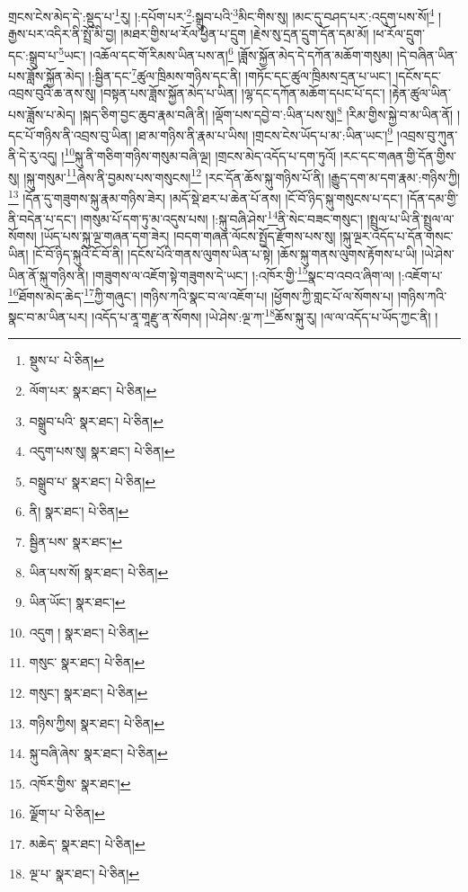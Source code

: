 གྲངས་ངེས་མེད་དེ་:སྡུད་པ་\footnote{སྡུས་པ་  པེ་ཅིན། }རུ། །:དཔོག་པར་\footnote{ལོག་པར་  སྣར་ཐང་།  པེ་ཅིན། }:སྒྲུབ་པའི་\footnote{བསྒྲུབ་པའི་  སྣར་ཐང་།  པེ་ཅིན། }མིང་གིས་སུ། །མང་དུ་བཤད་པར་:འདུག་པས་སོ།\footnote{འདུག་པས་སུ།  སྣར་ཐང་།  པེ་ཅིན། } །རྒྱས་པར་འདིར་ནི་སྤྲོ་མི་བྱ། །མཐར་གྱིས་ཕ་རོལ་ཕྱིན་པ་དྲུག །རྗེས་སུ་དྲན་དྲུག་དོན་དམ་མོ། །ཕ་རོལ་དྲུག་དང་:སྒྲུབ་པ་\footnote{བསྒྲུབ་པ་  སྣར་ཐང་།  པེ་ཅིན། }ཡང་། །འཆོལ་དང་གོ་རིམས་ཡིན་པས་ན།\footnote{ནི།  སྣར་ཐང་།  པེ་ཅིན། } །ཟློས་སྐྱོན་མེད་དེ་དཀོན་མཆོག་གསུམ། །དེ་བཞིན་ཡིན་པས་ཟློས་སྐྱོན་མེད། །:སྦྱིན་དང་\footnote{སྦྱིན་པས་  སྣར་ཐང་། }ཚུལ་ཁྲིམས་གཉིས་དང་ནི། །གཏོང་དང་ཚུལ་ཁྲིམས་དྲན་པ་ཡང་། །དངོས་དང་འབྲས་བུའི་ཆ་ནས་སུ། །བསྟན་པས་ཟློས་སྐྱོན་མེད་པ་ཡིན། །ལྷ་དང་དཀོན་མཆོག་དཔང་པོ་དང་། །རྟེན་ཚུལ་ཡིན་པས་ཟློས་པ་མེད། །སྐད་ཅིག་བྱང་ཆུབ་རྣམ་བཞི་ནི། །ལྡོག་པས་དབྱེ་བ་:ཡིན་པས་སུ།\footnote{ཡིན་པས་སོ།  སྣར་ཐང་།  པེ་ཅིན། } །རིམ་གྱིས་སྐྱེ་བ་མ་ཡིན་ནོ། །དང་པོ་གཉིས་ནི་འབྲས་བུ་ཡིན། །ཐ་མ་གཉིས་ནི་རྣམ་པ་ཡིས། །གྲངས་ངེས་ཡོད་པ་མ་:ཡིན་ཡང་།\footnote{ཡིན་ཡོང་།  སྣར་ཐང་། } །འབྲས་བུ་ཀུན་ནི་དེ་རུ་འདུ། །\footnote{འདུག །  སྣར་ཐང་།  པེ་ཅིན། }སྐུ་ནི་གཅིག་གཉིས་གསུམ་བཞི་ལྔ། །གྲངས་མེད་འདོད་པ་དག་ཏུའོ། །རང་དང་གཞན་གྱི་དོན་གྱིས་སུ། །སྐུ་གསུམ་\footnote{གསུང་  སྣར་ཐང་།  པེ་ཅིན། }ཞེས་ནི་བྱམས་པས་གསུངས།\footnote{གསུང་།  སྣར་ཐང་།  པེ་ཅིན། } །རང་དོན་ཆོས་སྐུ་གཉིས་པོ་ནི། །རྒྱུད་དག་མ་དག་རྣམ་:གཉིས་ཀྱི།\footnote{གཉིས་ཀྱིས།  སྣར་ཐང་།  པེ་ཅིན། } །དོན་དུ་གཟུགས་སྐུ་རྣམ་གཉིས་ཟེར། །མདོ་སྡེ་ཐར་པ་ཆེན་པོ་ནས། །ངོ་བོ་ཉིད་སྐུ་གསུངས་པ་དང་། །དོན་དམ་གྱི་ནི་བདེན་པ་དང་། །གསུམ་པོ་དག་ཏུ་མ་འདུས་པས། །:སྐུ་བཞི་ཤེས་\footnote{སྐུ་བཞི་ཞེས་  སྣར་ཐང་།  པེ་ཅིན། }ནི་སེང་བཟང་གསུང་། །སྤྲུལ་པ་ཡི་ནི་སྤྲུལ་ལ་སོགས། །ཡོད་པས་སྐུ་ལྔ་གཞན་དག་ཟེར། །བདག་གཞན་ལོངས་སྤྱོད་རྫོགས་པས་སུ། །སྐུ་ལྔར་འདོད་པ་དོན་གསང་ཡིན། །ངོ་བོ་ཉིད་སྐུའི་ངོ་བོ་ནི། །དངོས་པོའི་གནས་ལུགས་ཡིན་པ་སྟེ། །ཆོས་སྐུ་གནས་ལུགས་རྟོགས་པ་ཡི། །ཡེ་ཤེས་ཡིན་ནོ་སྐུ་གཉིས་ནི། །གཟུགས་ལ་འཇོག་སྟེ་གཟུགས་དེ་ཡང་། །:འཁོར་གྱི་\footnote{འཁོར་གྱིས་  སྣར་ཐང་། }སྣང་བ་འབའ་ཞིག་ལ། །:འཇོག་པ་\footnote{ལྗོག་པ་  པེ་ཅིན། }ཐོགས་མེད་ཆེད་\footnote{མཆེད་  སྣར་ཐང་།  པེ་ཅིན། }ཀྱི་གཞུང་། །གཉིས་ཀའི་སྣང་བ་ལ་འཇོག་པ། །ཕྱོགས་ཀྱི་གླང་པོ་ལ་སོགས་པ། །གཉིས་ཀའི་སྣང་བ་མ་ཡིན་པར། །འདོད་པ་ནཱ་གཱརྫུ་ན་སོགས། །ཡེ་ཤེས་:ལྔ་ཀ་\footnote{ལྔ་པ་  སྣར་ཐང་།  པེ་ཅིན། }ཆོས་སྐུ་རུ། །ལ་ལ་འདོད་པ་ཡོད་ཀྱང་ནི། །
